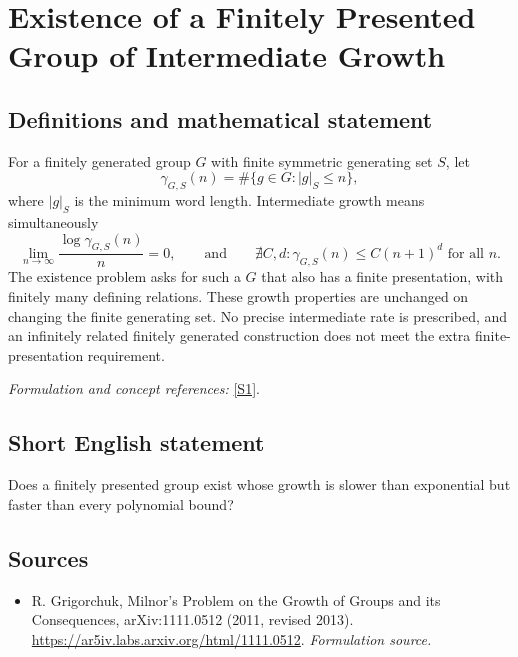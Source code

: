 \documentclass[11pt]{article}
\begin{document}
\section*{\texorpdfstring{Existence of a Finitely Presented Group of Intermediate Growth}{Existence of a Finitely Presented Group of Intermediate Growth}}\label{374}
\subsection{Definitions and mathematical statement}
For a finitely generated group $G$ with finite symmetric generating set $S$, let
\[
 \gamma_{G,S}(n)=\#\{g\in G:|g|_S\le n\},
\]
where $|g|_S$ is the minimum word length. Intermediate growth means simultaneously
\[
 \lim_{n\to\infty}\frac{\log\gamma_{G,S}(n)}n=0,
 \qquad\text{and}\qquad
 \nexists C,d:\gamma_{G,S}(n)\le C(n+1)^d\text{ for all }n.
\]
The existence problem asks for such a $G$ that also has a finite presentation, with finitely many defining relations. These growth properties are unchanged on changing the finite generating set. No precise intermediate rate is prescribed, and an infinitely related finitely generated construction does not meet the extra finite-presentation requirement.
\par\smallskip\textit{Formulation and concept references:} \href{https://ar5iv.labs.arxiv.org/html/1111.0512}{[S1]}.

\subsection{Short English statement}
Does a finitely presented group exist whose growth is slower than exponential but faster than every polynomial bound?
\subsection{Sources}
\begin{itemize}
\item[S1]R. Grigorchuk, Milnor's Problem on the Growth of Groups and its Consequences, arXiv:1111.0512 (2011, revised 2013).
\url{https://ar5iv.labs.arxiv.org/html/1111.0512}.
\textit{Formulation source.}
\end{itemize}
\end{document}
